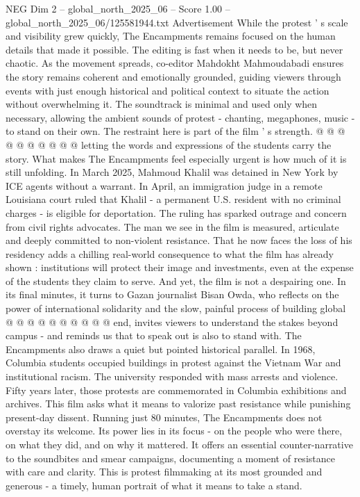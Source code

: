 \begin{textsample}{NEG Dim 2 – global\_north\_2025\_06 – Score 1.00 – global\_north\_2025\_06/125581944.txt}
Advertisement While the protest ' s scale and visibility grew quickly, The Encampments remains focused on the human details that made it possible.
The editing is fast when it needs to be, but never chaotic.
As the movement spreads, co-editor Mahdokht Mahmoudabadi ensures the story remains coherent and emotionally grounded, guiding viewers through events with just enough historical and political context to situate the action without overwhelming it.
The soundtrack is minimal and used only when necessary, allowing the ambient sounds of protest - chanting, megaphones, music - to stand on their own.
The restraint here is part of the film ' s strength. @ @ @ @ @ @ @ @ @ @ letting the words and expressions of the students carry the story.
What makes The Encampments feel especially urgent is how much of it is still unfolding.
In March 2025, Mahmoud Khalil was detained in New York by ICE agents without a warrant.
In April, an immigration judge in a remote Louisiana court ruled that Khalil - a permanent U.S. resident with no criminal charges - is eligible for deportation.
The ruling has sparked outrage and concern from civil rights advocates.
The man we see in the film is measured, articulate and deeply committed to non-violent resistance.
That he now faces the loss of his residency adds a chilling real-world consequence to what the film has already shown : institutions will protect their image and investments, even at the expense of the students they claim to serve.
And yet, the film is not a despairing one.
In its final minutes, it turns to Gazan journalist Bisan Owda, who reflects on the power of international solidarity and the slow, painful process of building global @ @ @ @ @ @ @ @ @ @ end, invites viewers to understand the stakes beyond campus - and reminds us that to speak out is also to stand with.
The Encampments also draws a quiet but pointed historical parallel.
In 1968, Columbia students occupied buildings in protest against the Vietnam War and institutional racism.
The university responded with mass arrests and violence.
Fifty years later, those protests are commemorated in Columbia exhibitions and archives.
This film asks what it means to valorize past resistance while punishing present-day dissent.
Running just 80 minutes, The Encampments does not overstay its welcome.
Its power lies in its focus - on the people who were there, on what they did, and on why it mattered.
It offers an essential counter-narrative to the soundbites and smear campaigns, documenting a moment of resistance with care and clarity.
This is protest filmmaking at its most grounded and generous - a timely, human portrait of what it means to take a stand.

\end{textsample}

